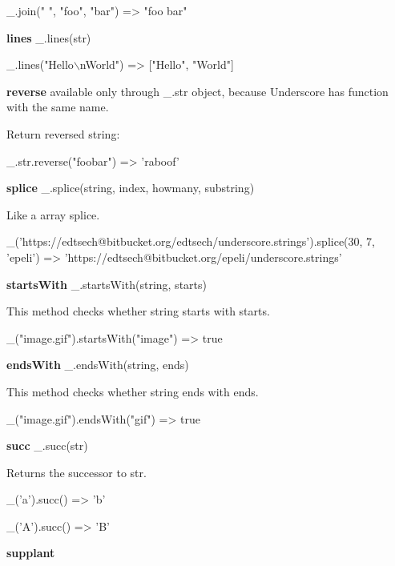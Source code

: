 \begin{DoxyCode}
\_.join(" ", "foo", "bar")
=> "foo bar"
\end{DoxyCode}


{\bfseries lines} \+\_\+.\+lines(str)


\begin{DoxyCode}
\_.lines("Hello\(\backslash\)nWorld")
=> ["Hello", "World"]
\end{DoxyCode}


{\bfseries reverse} available only through \+\_\+.\+str object, because Underscore has function with the same name.

Return reversed string\+:


\begin{DoxyCode}
\_.str.reverse("foobar")
=> 'raboof'
\end{DoxyCode}


{\bfseries splice} \+\_\+.\+splice(string, index, howmany, substring)

Like a array splice.


\begin{DoxyCode}
\_('https://edtsech@bitbucket.org/edtsech/underscore.strings').splice(30, 7, 'epeli')
=> 'https://edtsech@bitbucket.org/epeli/underscore.strings'
\end{DoxyCode}


{\bfseries starts\+With} \+\_\+.\+starts\+With(string, starts)

This method checks whether string starts with starts.


\begin{DoxyCode}
\_("image.gif").startsWith("image")
=> true
\end{DoxyCode}


{\bfseries ends\+With} \+\_\+.\+ends\+With(string, ends)

This method checks whether string ends with ends.


\begin{DoxyCode}
\_("image.gif").endsWith("gif")
=> true
\end{DoxyCode}


{\bfseries succ} \+\_\+.\+succ(str)

Returns the successor to str.


\begin{DoxyCode}
\_('a').succ()
=> 'b'

\_('A').succ()
=> 'B'
\end{DoxyCode}


{\bfseries supplant}

